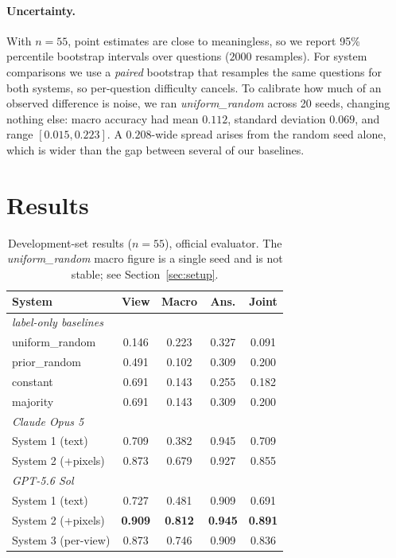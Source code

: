 \documentclass[11pt]{article}
\begin{document}
\paragraph{Uncertainty.} With $n=55$, point estimates are close to
meaningless, so we report 95\% percentile bootstrap intervals over questions
($2000$ resamples). For system comparisons we use a \emph{paired} bootstrap
that resamples the same questions for both systems, so per-question difficulty
cancels. To calibrate how much of an observed difference is noise, we ran
\textit{uniform\_random} across 20 seeds, changing nothing else: macro
accuracy had mean $0.112$, standard deviation $0.069$, and range
$[0.015,0.223]$. A $0.208$-wide spread arises from the random seed alone,
which is wider than the gap between several of our baselines.

\section{Results}
\label{sec:results}

\begin{table}[t]
\centering\small\setlength{\tabcolsep}{4pt}
\begin{tabular}{@{}lcccc@{}}
\toprule
System & View & Macro & Ans. & Joint \\
\midrule
\multicolumn{5}{l}{\textit{label-only baselines}} \\
uniform\_random   & 0.146 & 0.223 & 0.327 & 0.091 \\
prior\_random     & 0.491 & 0.102 & 0.309 & 0.200 \\
constant          & 0.691 & 0.143 & 0.255 & 0.182 \\
majority          & 0.691 & 0.143 & 0.309 & 0.200 \\
\midrule
\multicolumn{5}{l}{\textit{Claude Opus 5}} \\
System 1 (text)    & 0.709 & 0.382 & 0.945 & 0.709 \\
System 2 (+pixels) & 0.873 & 0.679 & 0.927 & 0.855 \\
\midrule
\multicolumn{5}{l}{\textit{GPT-5.6 Sol}} \\
System 1 (text)    & 0.727 & 0.481 & 0.909 & 0.691 \\
System 2 (+pixels) & \textbf{0.909} & \textbf{0.812} & \textbf{0.945} & \textbf{0.891} \\
System 3 (per-view)& 0.873 & 0.746 & 0.909 & 0.836 \\
\bottomrule
\end{tabular}
\caption{Development-set results ($n=55$), official evaluator. The
\textit{uniform\_random} macro figure is a single seed and is not stable; see
Section~\ref{sec:setup}.}
\label{tab:dev}
\end{table}
\end{document}
